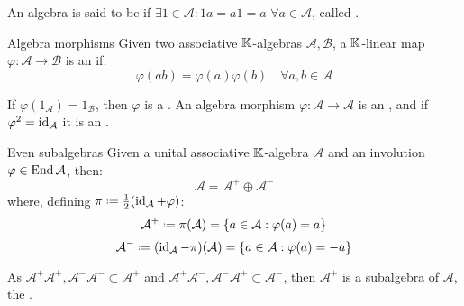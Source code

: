 An algebra is said to be  if $ \exists \mathit{1} \in \mathcal{A} : \mathit{1}a = a\mathit{1} = a \,\,\forall a \in \mathcal{A} $, called .

\begin{definition}{Algebra morphisms}{}
  Given two associative $ \mathbb{K} $-algebras $ \mathcal{A} , \mathcal{B} $, a $ \mathbb{K} $-linear map $ \varphi : \mathcal{A} \rightarrow \mathcal{B} $ is an  if:
  \begin{equation*}
    \varphi(ab) = \varphi(a) \varphi(b) \quad\forall a,b \in \mathcal{A}
  \end{equation*}
\end{definition}

If $ \varphi(\mathit{1}_\mathcal{A}) = \mathit{1}_\mathcal{B} $, then $ \varphi $ is a . An algebra morphism $ \varphi : \mathcal{A} \rightarrow \mathcal{A} $ is an , and if $ \varphi^2 = \operatorname{id}_\mathcal{A} $ it is an .

\begin{proposition}{Even subalgebras}{}
  Given a unital associative $ \mathbb{K} $-algebra $ \mathcal{A} $ and an involution $ \varphi \in \operatorname{End} \mathcal{A} $, then:
  \begin{equation*}
    \mathcal{A} = \mathcal{A}^+ \oplus \mathcal{A}^-
  \end{equation*}
  where, defining $ \pi \defeq \frac{1}{2} (\id_\mathcal{A} + \varphi) $:
  \begin{equation*}
    \mathcal{A}^+ \defeq \pi(\mathcal{A}) = \{a \in \mathcal{A} : \varphi(a) = a\}
  \end{equation*}
  \begin{equation*}
    \mathcal{A}^- \defeq (\id_\mathcal{A} - \pi)(\mathcal{A}) = \{a \in \mathcal{A} : \varphi(a) = -a\}
  \end{equation*}
\end{proposition}

As $ \mathcal{A}^+ \mathcal{A}^+ , \mathcal{A}^- \mathcal{A}^- \subset \mathcal{A}^+ $ and $ \mathcal{A}^+ \mathcal{A}^- , \mathcal{A}^- \mathcal{A}^+ \subset \mathcal{A}^- $, then $ \mathcal{A}^+ $ is a subalgebra of $ \mathcal{A} $, the .

